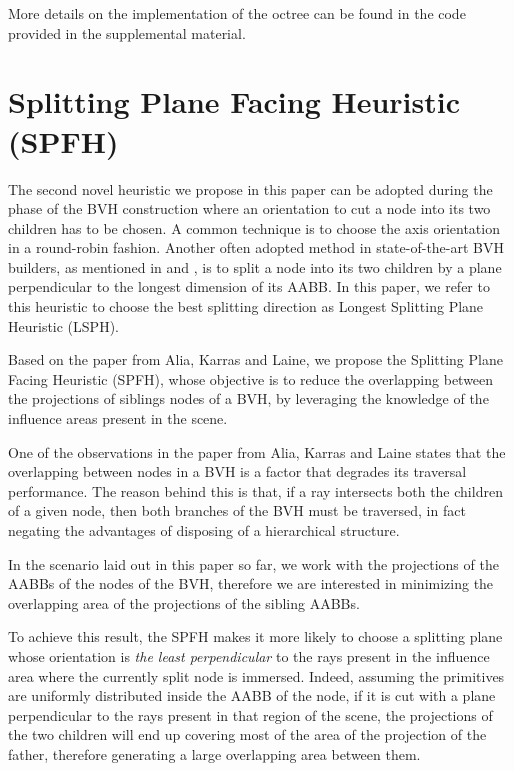 \documentclass[acmtog, anonymous, review]{acmart}
\begin{document}
More details on the implementation of the octree can be found in the code provided in the supplemental material.

\section{Splitting Plane Facing Heuristic (SPFH)} \label{sec:spfh}
The second novel heuristic we propose in this paper can be adopted during the phase of the BVH construction where an orientation to cut a node into its two children has to be chosen. A common technique is to choose the axis orientation in a round-robin fashion. Another often adopted method in state-of-the-art BVH builders, as mentioned in \cite{bvh_survey} and \cite{lsph}, is to split a node into its two children by a plane perpendicular to the longest dimension of its AABB. In this paper, we refer to this heuristic to choose the best splitting direction as Longest Splitting Plane Heuristic (LSPH).

Based on the paper \cite{overlapping_heuristic} from Alia, Karras and Laine, we propose the Splitting Plane Facing Heuristic (SPFH), whose objective is to reduce the overlapping between the projections of siblings nodes of a BVH, by leveraging the knowledge of the influence areas present in the scene.

One of the observations in the paper from Alia, Karras and Laine states that the overlapping between nodes in a BVH is a factor that degrades its traversal performance. The reason behind this is that, if a ray intersects both the children of a given node, then both branches of the BVH must be traversed, in fact negating the advantages of disposing of a hierarchical structure.

In the scenario laid out in this paper so far, we work with the projections of the AABBs of the nodes of the BVH, therefore we are interested in minimizing the overlapping area of the projections of the sibling AABBs.

To achieve this result, the SPFH makes it more likely to choose a splitting plane whose orientation is \textit{the least perpendicular} to the rays present in the influence area where the currently split node is immersed. Indeed, assuming the primitives are uniformly distributed inside the AABB of the node, if it is cut with a plane perpendicular to the rays present in that region of the scene, the projections of the two children will end up covering most of the area of the projection of the father, therefore generating a large overlapping area between them.
\end{document}
